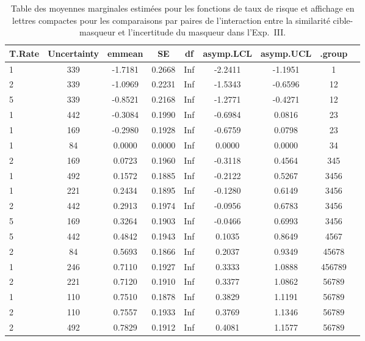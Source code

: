 \begin{table}[!t]
\caption[Table des moyennes marginales estimées pour les fonctions de taux de risque pour l'Expérience~III]{Table des moyennes marginales estimées pour les fonctions de taux de risque et affichage en lettres compactes pour les comparaisons par paires de l'interaction entre la similarité cible-masqueur et l'incertitude du masqueur dans l'Exp.~III.} 
\label{tab:cld_Exp-III}
\footnotesize
\centering
\begin{tabular}{|l|*{8}{c|}}
\hline
\textbf{T.Rate} & \textbf{Uncertainty} & \textbf{emmean} & \textbf{SE} & \textbf{df} & \textbf{asymp.LCL} & \textbf{asymp.UCL} & \textbf{.group} \\ 
\hline
1 & 339 & -1.7181 & 0.2668 & Inf & -2.2411 & -1.1951 & 1 \\ 
2 & 339 & -1.0969 & 0.2231 & Inf & -1.5343 & -0.6596 & 12 \\ 
5 & 339 & -0.8521 & 0.2168 & Inf & -1.2771 & -0.4271 & 12 \\ 
1 & 442 & -0.3084 & 0.1990 & Inf & -0.6984 & 0.0816 & 23 \\ 
1 & 169 & -0.2980 & 0.1928 & Inf & -0.6759 & 0.0798 & 23 \\ 
1 & 84 & 0.0000 & 0.0000 & Inf & 0.0000 & 0.0000 & 34 \\ 
2 & 169 & 0.0723 & 0.1960 & Inf & -0.3118 & 0.4564 & 345 \\ 
1 & 492 & 0.1572 & 0.1885 & Inf & -0.2122 & 0.5267 & 3456 \\ 
1 & 221 & 0.2434 & 0.1895 & Inf & -0.1280 & 0.6149 & 3456 \\ 
2 & 442 & 0.2913 & 0.1974 & Inf & -0.0956 & 0.6783 & 3456 \\ 
5 & 169 & 0.3264 & 0.1903 & Inf & -0.0466 & 0.6993 & 3456 \\ 
5 & 442 & 0.4842 & 0.1943 & Inf & 0.1035 & 0.8649 & 4567 \\ 
2 & 84 & 0.5693 & 0.1866 & Inf & 0.2037 & 0.9349 & 45678 \\ 
1 & 246 & 0.7110 & 0.1927 & Inf & 0.3333 & 1.0888 & 456789 \\ 
2 & 221 & 0.7120 & 0.1910 & Inf & 0.3377 & 1.0862 & 56789 \\ 
1 & 110 & 0.7510 & 0.1878 & Inf & 0.3829 & 1.1191 & 56789 \\ 
2 & 110 & 0.7557 & 0.1933 & Inf & 0.3769 & 1.1346 & 56789 \\ 
2 & 492 & 0.7829 & 0.1912 & Inf & 0.4081 & 1.1577 & 56789 \\ 

\end{tabular}
\end{table}
